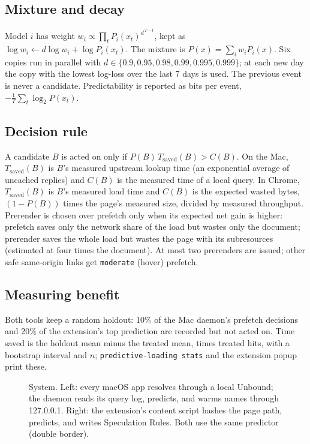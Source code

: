 \documentclass[11pt]{article}
\begin{document}
\subsection{Mixture and decay}
Model $i$ has weight $w_i \propto \prod_t P_i(x_t)^{d^{\,T-t}}$, kept as $\log w_i \leftarrow d\log w_i + \log P_i(x_t)$. The mixture is $P(x)=\sum_i w_i P_i(x)$. Six copies run in parallel with $d\in\{0.9, 0.95, 0.98, 0.99, 0.995, 0.999\}$; at each new day the copy with the lowest log-loss over the last 7 days is used. The previous event is never a candidate. Predictability is reported as bits per event, $-\frac1T\sum_t \log_2 P(x_t)$.

\subsection{Decision rule}
A candidate $B$ is acted on only if $P(B)\,T_{\mathrm{saved}}(B) > C(B)$. On the Mac, $T_{\mathrm{saved}}(B)$ is $B$'s measured upstream lookup time (an exponential average of uncached replies) and $C(B)$ is the measured time of a local query. In Chrome, $T_{\mathrm{saved}}(B)$ is $B$'s measured load time and $C(B)$ is the expected wasted bytes, $(1-P(B))$ times the page's measured size, divided by measured throughput. Prerender is chosen over prefetch only when its expected net gain is higher: prefetch saves only the network share of the load but wastes only the document; prerender saves the whole load but wastes the page with its subresources (estimated at four times the document). At most two prerenders are issued; other safe same-origin links get \texttt{moderate} (hover) prefetch.

\subsection{Measuring benefit}
Both tools keep a random holdout: 10\% of the Mac daemon's prefetch decisions and 20\% of the extension's top prediction are recorded but not acted on. Time saved is the holdout mean minus the treated mean, times treated hits, with a bootstrap interval and $n$; \texttt{predictive-loading stats} and the extension popup print these.

\begin{figure}[t]
\centering
\resizebox{\textwidth}{!}{\systemdiagram}
\caption{System. Left: every macOS app resolves through a local Unbound; the daemon reads its query log, predicts, and warms names through 127.0.0.1. Right: the extension's content script hashes the page path, predicts, and writes Speculation Rules. Both use the same predictor (double border).}
\label{fig:system}
\end{figure}
\end{document}
